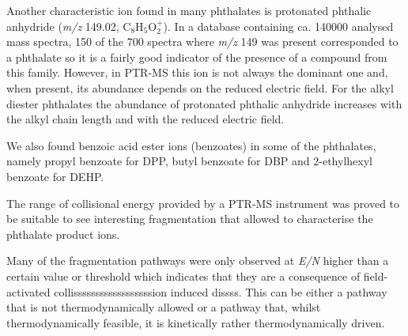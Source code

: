 Another characteristic ion found in many phthalates is protonated phthalic anhydride (\textit{m/z} 149.02, C$_8$H$_5$O$_2^+$). In a database containing  ca. 140000 analysed mass spectra,  150 of the 700 spectra where \textit{m/z} 149 was present corresponded to a phthalate \cite{mclafferty1993interpretation} so it is a fairly good indicator of the presence of a compound from this family. 
However, in PTR-MS this ion is not always the dominant one and, when present, its abundance depends on  the reduced electric field. For the alkyl diester phthalates the abundance of protonated phthalic anhydride  increases with the alkyl chain length and with the reduced electric field.

We also found  benzoic acid ester ions (benzoates) in some of the phthalates, namely propyl benzoate for DPP, butyl benzoate for DBP and 2-ethylhexyl benzoate for DEHP.


The range of collisional energy provided by a  PTR-MS instrument was proved to be suitable to see interesting fragmentation that allowed to characterise the phthalate product ions.

Many of the fragmentation pathways were only observed at \textit{E/N} higher than a certain value or threshold which indicates that they are a consequence of field-activated collissssssssssssssssssion induced dissss.
%
This can be either a pathway that is not thermodynamically allowed or a pathway that, whilst thermodynamically feasible, it is kinetically rather thermodynamically driven.





